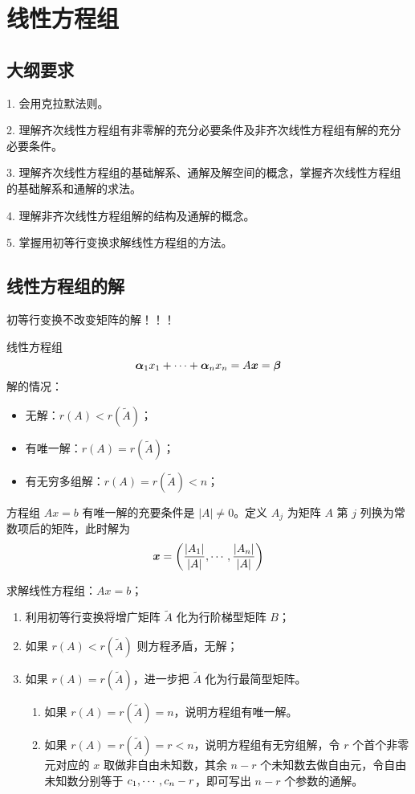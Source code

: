 \section{线性方程组}

\subsection{大纲要求}

1. 会用克拉默法则。

2. 理解齐次线性方程组有非零解的充分必要条件及非齐次线性方程组有解的充分必要条件。

3. 理解齐次线性方程组的基础解系、通解及解空间的概念，掌握齐次线性方程组的基础解系和通解的求法。

4. 理解非齐次线性方程组解的结构及通解的概念。

5. 掌握用初等行变换求解线性方程组的方法。

\subsection{线性方程组的解}

初等行变换不改变矩阵的解！！！

线性方程组
\[ \boldsymbol{\alpha}_1x_1 + \cdots + \boldsymbol{\alpha}_nx_n = A \boldsymbol{x} = \boldsymbol{\beta} \]
解的情况：
\begin{itemize}
	\item 无解：$r(A) < r(\widetilde{A})$；
	\item 有唯一解：$r(A) = r(\widetilde{A})$；
	\item 有无穷多组解：$r(A) = r(\widetilde{A}) < n$；
\end{itemize}


\begin{theorem}[Cramer 法则]
	方程组 $Ax = b$ 有唯一解的充要条件是 $|A| \neq 0$。定义 $A_j$ 为矩阵 $A$ 第 $j$ 列换为常数项后的矩阵，此时解为
	\[ \boldsymbol{x} = \left( \frac{|A_1|}{|A|}, \cdots, \frac{|A_n|}{|A|} \right) \]
\end{theorem}

求解线性方程组：$Ax = b$；
\begin{enumerate}
	\item 利用初等行变换将增广矩阵 $\widetilde{A}$ 化为行阶梯型矩阵 $B$；
	\item 如果 $r(A) < r(\widetilde{A})$ 则方程矛盾，无解；
	\item 如果 $r(A) = r(\widetilde{A})$，进一步把 $\widetilde{A}$ 化为行最简型矩阵。
	      \begin{enumerate}
					\item 如果 $r(A) = r(\widetilde{A}) = n$，说明方程组有唯一解。
		      \item 如果 $r(A) = r(\widetilde{A}) = r < n$，说明方程组有无穷组解，令 $r$ 个首个非零元对应的 $x$ 取做非自由未知数，其余 $n-r$ 个未知数去做自由元，令自由未知数分别等于 $c_1,\cdots,c_n-r$，即可写出 $n-r$ 个参数的通解。
	      \end{enumerate}
\end{enumerate}

